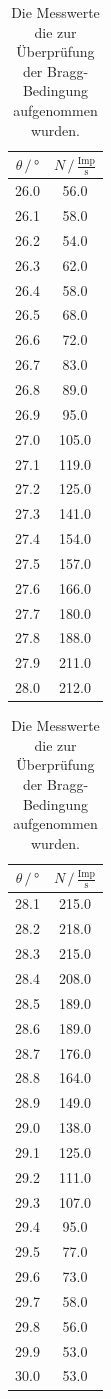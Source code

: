 \begin{table}
  \centering
  \caption{Die Messwerte die zur Überprüfung der Bragg-Bedingung aufgenommen wurden.}
  \begin{tabular}[t]{cc}
  \toprule
  $\theta \,/\, \si{\degree}$ & $N \,/\, \frac{\text{Imp}}{\si{\second}}$ \\ 
  \midrule
    26.0	&   56.0\\
    26.1	&   58.0\\
    26.2	&   54.0\\
    26.3	&   62.0\\
    26.4	&   58.0\\
    26.5	&   68.0\\
    26.6	&   72.0\\
    26.7	&   83.0\\
    26.8	&   89.0\\
    26.9	&   95.0\\
    27.0	&   105.0\\
    27.1	&   119.0\\
    27.2	&   125.0\\
    27.3	&   141.0\\
    27.4	&   154.0\\
    27.5	&   157.0\\
    27.6	&   166.0\\
    27.7	&   180.0\\
    27.8	&   188.0\\
    27.9	&   211.0\\
    28.0	&   212.0\\
  \bottomrule
\end{tabular}
\begin{tabular}[t]{cc}
  \toprule
  $\theta \,/\, \si{\degree}$ & $N \,/\, \frac{\text{Imp}}{\si{\second}}$ \\ 
  \midrule
    28.1	&   215.0 \\
    28.2    &	218.0\\
    28.3    &	215.0\\
    28.4    &	208.0\\
    28.5    &	189.0\\
    28.6    &	189.0\\
    28.7    &	176.0\\
    28.8    &	164.0\\
    28.9    &	149.0\\
    29.0    &	138.0\\
    29.1    &	125.0\\
    29.2    &	111.0\\
    29.3    &	107.0\\
    29.4    &	95.0\\
    29.5    &	77.0\\
    29.6    &	73.0\\
    29.7    &	58.0\\
    29.8    &	56.0\\
    29.9    &	53.0\\
    30.0    &	53.0\\
  \bottomrule
  \end{tabular}
  \label{tab:bragg}
\end{table}

